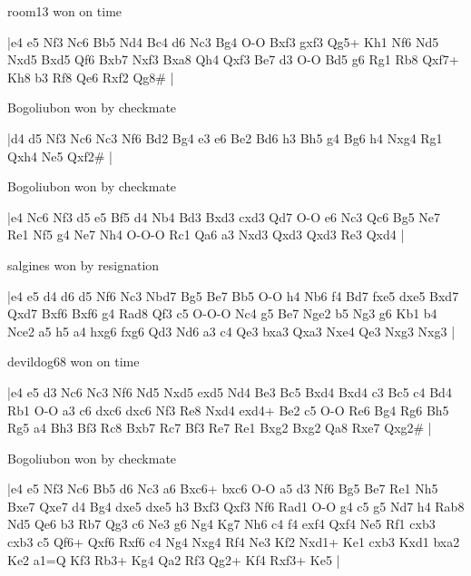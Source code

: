 \showboard

room13 won on time

\makegametitle
|e4 e5 Nf3 Nc6 Bb5 Nd4 Bc4 d6 Nc3 Bg4 O-O Bxf3 gxf3 Qg5+ Kh1 Nf6 Nd5 Nxd5 Bxd5 Qf6 Bxb7 Nxf3 Bxa8 Qh4 Qxf3 Be7 d3 O-O Bd5 g6 Rg1 Rb8 Qxf7+ Kh8 b3 Rf8 Qe6 Rxf2 Qg8\#  |

\showboard

Bogoliubon won by checkmate

\makegametitle
|d4 d5 Nf3 Nc6 Nc3 Nf6 Bd2 Bg4 e3 e6 Be2 Bd6 h3 Bh5 g4 Bg6 h4 Nxg4 Rg1 Qxh4 Ne5 Qxf2\#  |

\showboard

Bogoliubon won by checkmate

\makegametitle
|e4 Nc6 Nf3 d5 e5 Bf5 d4 Nb4 Bd3 Bxd3 cxd3 Qd7 O-O e6 Nc3 Qc6 Bg5 Ne7 Re1 Nf5 g4 Ne7 Nh4 O-O-O Rc1 Qa6 a3 Nxd3 Qxd3 Qxd3 Re3 Qxd4  |

\showboard

salgines won by resignation

\makegametitle
|e4 e5 d4 d6 d5 Nf6 Nc3 Nbd7 Bg5 Be7 Bb5 O-O h4 Nb6 f4 Bd7 fxe5 dxe5 Bxd7 Qxd7 Bxf6 Bxf6 g4 Rad8 Qf3 c5 O-O-O Nc4 g5 Be7 Nge2 b5 Ng3 g6 Kb1 b4 Nce2 a5 h5 a4 hxg6 fxg6 Qd3 Nd6 a3 c4 Qe3 bxa3 Qxa3 Nxe4 Qe3 Nxg3 Nxg3  |

\showboard

devildog68 won on time

\makegametitle
|e4 e5 d3 Nc6 Nc3 Nf6 Nd5 Nxd5 exd5 Nd4 Be3 Bc5 Bxd4 Bxd4 c3 Bc5 c4 Bd4 Rb1 O-O a3 c6 dxc6 dxc6 Nf3 Re8 Nxd4 exd4+ Be2 c5 O-O Re6 Bg4 Rg6 Bh5 Rg5 a4 Bh3 Bf3 Rc8 Bxb7 Rc7 Bf3 Re7 Re1 Bxg2 Bxg2 Qa8 Rxe7 Qxg2\#  |

\showboard

Bogoliubon won by checkmate

\makegametitle
|e4 e5 Nf3 Nc6 Bb5 d6 Nc3 a6 Bxc6+ bxc6 O-O a5 d3 Nf6 Bg5 Be7 Re1 Nh5 Bxe7 Qxe7 d4 Bg4 dxe5 dxe5 h3 Bxf3 Qxf3 Nf6 Rad1 O-O g4 c5 g5 Nd7 h4 Rab8 Nd5 Qe6 b3 Rb7 Qg3 c6 Ne3 g6 Ng4 Kg7 Nh6 c4 f4 exf4 Qxf4 Ne5 Rf1 cxb3 cxb3 c5 Qf6+ Qxf6 Rxf6 c4 Ng4 Nxg4 Rf4 Ne3 Kf2 Nxd1+ Ke1 cxb3 Kxd1 bxa2 Ke2 a1=Q Kf3 Rb3+ Kg4 Qa2 Rf3 Qg2+ Kf4 Rxf3+ Ke5  |

